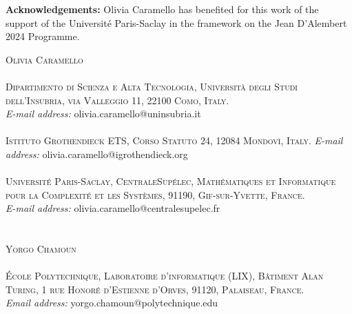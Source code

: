 \documentclass{article}
\begin{document}



\vspace{1cm}
\textbf{Acknowledgements:} Olivia Caramello has benefited for this work of the support of the Université Paris-Saclay in the framework on the Jean D’Alembert 2024 Programme.

\vspace{1cm}
\textsc{Olivia Caramello\\
\\
Dipartimento di Scienza e Alta Tecnologia, Università degli Studi dell’Insubria, via Valleggio 11, 22100 Como, Italy.}\\
\textit{E-mail address:} {\selectfont
olivia.caramello@uninsubria.it
}\\
\\
\textsc{Istituto Grothendieck ETS, Corso Statuto 24, 12084 Mondovì, Italy.}
\textit{E-mail address:} {\selectfont olivia.caramello@igrothendieck.org}\\
\\
\textsc{Université Paris-Saclay, CentraleSupélec, Mathématiques et Informatique pour la Complexité et les Systèmes, 91190, Gif-sur-Yvette, France.}\\ 
\textit{E-mail address:} {\selectfont olivia.caramello@centralesupelec.fr}\\
\\
\\
\textsc{Yorgo Chamoun \\
\\
École Polytechnique, Laboratoire d’informatique (LIX), Bâtiment Alan Turing, 1 rue Honoré d’Estienne d’Orves, 91120, Palaiseau, France.}\\
\textit{Email address:} {\selectfont yorgo.chamoun@polytechnique.edu}
\end{document}

